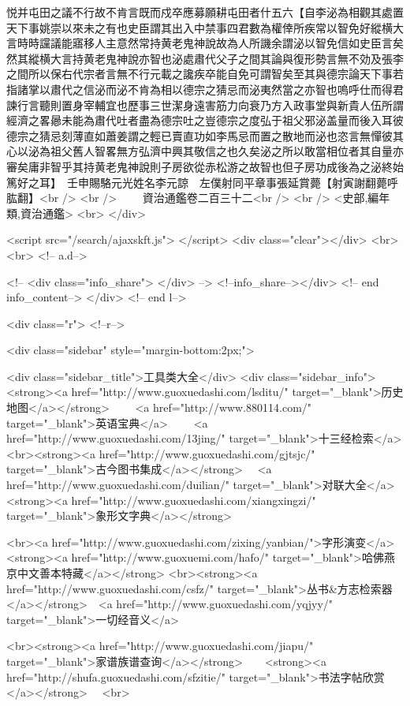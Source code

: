 悦并屯田之議不行故不肯言既而戍卒應募願耕屯田者什五六【自李泌為相觀其處置天下事姚崇以來未之有也史臣謂其出入中禁事四君數為權倖所疾常以智免好縱横大言時時讜議能寤移人主意然常持黄老鬼神說故為人所譏余謂泌以智免信如史臣言矣然其縱横大言持黄老鬼神說亦智也泌處肅代父子之間其論與復形勢言無不効及張李之間所以保右代宗者言無不行元載之讒疾卒能自免可謂智矣至其與德宗論天下事若指諸掌以肅代之信泌而泌不肯為相以德宗之猜忌而泌夷然當之亦智也嗚呼仕而得君諫行言聽則置身宰輔宜也歷事三世潔身遠害筋力向衰乃方入政事堂與新貴人伍所謂經濟之畧曏未能為肅代吐者盡為德宗吐之豈德宗之度弘于祖父邪泌盖量而後入耳彼德宗之猜忌刻薄直如蕭姜謂之輕已賣直功如李馬忌而置之散地而泌也恣言無憚彼其心以泌為祖父舊人智畧無方弘濟中興其敬信之也久矣泌之所以敢當相位者其自量亦審矣庸非智乎其持黄老鬼神說則子房欲從赤松游之故智也但子房功成後為之泌終始篤好之耳】　壬申賜駱元光姓名李元諒　左僕射同平章事張延賞薨【射寅謝翻薨呼肱翻】<br />
<br />
　　資治通鑑卷二百三十二<br />
<br />
<史部,編年類,資治通鑑>  <br>
   </div> 

<script src="/search/ajaxskft.js"> </script>
 <div class="clear"></div>
<br>
<br>
 <!-- a.d-->

 <!--
<div class="info_share">
</div> 
-->
 <!--info_share--></div>   <!-- end info_content-->
  </div> <!-- end l-->

<div class="r">   <!--r-->



<div class="sidebar"  style="margin-bottom:2px;">

 
<div class="sidebar_title">工具类大全</div>
<div class="sidebar_info">
<strong><a href="http://www.guoxuedashi.com/lsditu/" target="_blank">历史地图</a></strong>　　
<a href="http://www.880114.com/" target="_blank">英语宝典</a>　　
<a href="http://www.guoxuedashi.com/13jing/" target="_blank">十三经检索</a>　
<br><strong><a href="http://www.guoxuedashi.com/gjtsjc/" target="_blank">古今图书集成</a></strong>　
<a href="http://www.guoxuedashi.com/duilian/" target="_blank">对联大全</a>　<strong><a href="http://www.guoxuedashi.com/xiangxingzi/" target="_blank">象形文字典</a></strong>　

<br><a href="http://www.guoxuedashi.com/zixing/yanbian/">字形演变</a>　　<strong><a href="http://www.guoxuemi.com/hafo/" target="_blank">哈佛燕京中文善本特藏</a></strong>
<br><strong><a href="http://www.guoxuedashi.com/csfz/" target="_blank">丛书&方志检索器</a></strong>　<a href="http://www.guoxuedashi.com/yqjyy/" target="_blank">一切经音义</a>　　

<br><strong><a href="http://www.guoxuedashi.com/jiapu/" target="_blank">家谱族谱查询</a></strong>　　<strong><a href="http://shufa.guoxuedashi.com/sfzitie/" target="_blank">书法字帖欣赏</a></strong>　
<br>


